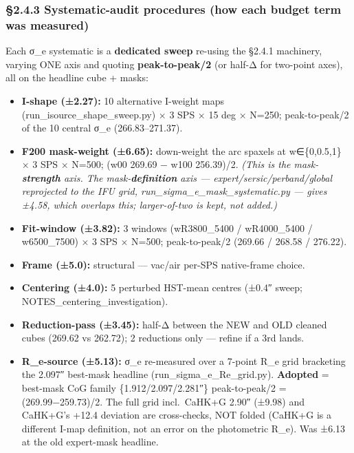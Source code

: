 \documentclass[
]{article}
\providecommand{\tightlist}{%
  \setlength{\itemsep}{0pt}\setlength{\parskip}{0pt}}
\newcommand{\BreakablePath}[1]{{\ttfamily\sloppy #1}}
\begin{document}
\hypertarget{systematic-audit-procedures-how-each-budget-term-was-measured}{%
\subsubsection{§2.4.3 Systematic-audit procedures (how each budget term
was
measured)}\label{systematic-audit-procedures-how-each-budget-term-was-measured}}

Each σ\_e systematic is a \textbf{dedicated sweep} re-using the §2.4.1
machinery, varying ONE axis and quoting \textbf{peak-to-peak/2} (or
half-Δ for two-point axes), all on the headline cube + masks:

\begin{itemize}
\tightlist
\item
  \textbf{I-shape (±2.27):} 10 alternative I-weight maps
  (\BreakablePath{run\_\discretionary{}{}{}isource\_\discretionary{}{}{}shape\_\discretionary{}{}{}sweep.\discretionary{}{}{}py})
  × 3 SPS × 15 deg × N=250; peak-to-peak/2 of the 10 central σ\_e
  (266.83--271.37).
\item
  \textbf{F200 mask-weight (±6.65):} down-weight the arc spaxels at
  w∈\{0,0.5,1\} × 3 SPS × N=500; (w00 269.69 − w100 256.39)/2.
  \emph{(This is the mask-\textbf{strength} axis. The
  mask-\textbf{definition} axis --- expert/sersic/perband/global
  reprojected to the IFU grid,
  \BreakablePath{run\_\discretionary{}{}{}sigma\_\discretionary{}{}{}e\_\discretionary{}{}{}mask\_\discretionary{}{}{}systematic.\discretionary{}{}{}py}
  --- gives ±4.58, which overlaps this; larger-of-two is kept, not
  added.)}
\item
  \textbf{Fit-window (±3.82):} 3 windows (wR3800\_5400 / wR4000\_5400 /
  w6500\_7500) × 3 SPS × N=500; peak-to-peak/2 (269.66 / 268.58 /
  276.22).
\item
  \textbf{Frame (±5.0):} structural --- vac/air per-SPS native-frame
  choice.
\item
  \textbf{Centering (±4.0):} 5 perturbed HST-mean centres (±0.4″ sweep;
  \BreakablePath{NOTES\_\discretionary{}{}{}centering\_\discretionary{}{}{}investigation}).
\item
  \textbf{Reduction-pass (±3.45):} half-Δ between the NEW and OLD
  cleaned cubes (269.62 vs 262.72); 2 reductions only --- refine if a
  3rd lands.
\item
  \textbf{R\_e-source (±5.13):} σ\_e re-measured over a 7-point R\_e
  grid bracketing the 2.097″ best-mask headline
  (\BreakablePath{run\_\discretionary{}{}{}sigma\_\discretionary{}{}{}e\_\discretionary{}{}{}Re\_\discretionary{}{}{}grid.\discretionary{}{}{}py}).
  \textbf{Adopted} = best-mask CoG family \{1.912/2.097/2.281″\}
  peak-to-peak/2 = (269.99−259.73)/2. The full grid incl.~CaHK+G 2.90″
  (±9.98) and CaHK+G's +12.4 deviation are cross-checks, NOT folded
  (CaHK+G is a different I-map definition, not an error on the
  photometric R\_e). Was ±6.13 at the old expert-mask headline.
\end{itemize}
\end{document}
